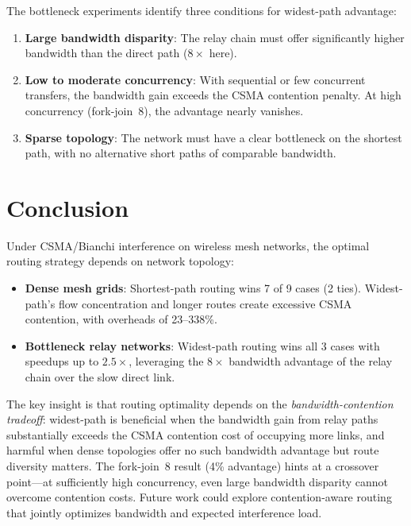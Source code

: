 \documentclass[11pt]{article}
\begin{document}
The bottleneck experiments identify three conditions for widest-path advantage:

\begin{enumerate}
    \item \textbf{Large bandwidth disparity}: The relay chain must offer
    significantly higher bandwidth than the direct path ($8\times$ here).
    \item \textbf{Low to moderate concurrency}: With sequential or few
    concurrent transfers, the bandwidth gain exceeds the CSMA contention
    penalty. At high concurrency (fork-join~8), the advantage nearly vanishes.
    \item \textbf{Sparse topology}: The network must have a clear bottleneck
    on the shortest path, with no alternative short paths of comparable
    bandwidth.
\end{enumerate}

\section{Conclusion}

Under CSMA/Bianchi interference on wireless mesh networks, the optimal routing
strategy depends on network topology:

\begin{itemize}
    \item \textbf{Dense mesh grids}: Shortest-path routing wins 7 of 9
    cases (2 ties). Widest-path's flow concentration and longer routes create
    excessive CSMA contention, with overheads of 23--338\%.
    \item \textbf{Bottleneck relay networks}: Widest-path routing wins all 3
    cases with speedups up to $2.5\times$, leveraging the $8\times$ bandwidth
    advantage of the relay chain over the slow direct link.
\end{itemize}

The key insight is that routing optimality depends on the
\emph{bandwidth-contention tradeoff}: widest-path is beneficial when the
bandwidth gain from relay paths substantially exceeds the CSMA contention cost
of occupying more links, and harmful when dense topologies offer no such
bandwidth advantage but route diversity matters. The fork-join~8 result
(4\% advantage) hints at a crossover point---at sufficiently high
concurrency, even large bandwidth disparity cannot overcome contention costs.
Future work could explore contention-aware routing that jointly optimizes
bandwidth and expected interference load.
\end{document}
